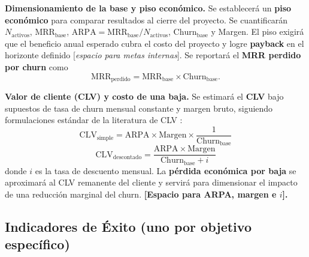 \textbf{Dimensionamiento de la base y piso económico.} Se establecerá un \textbf{piso económico} para comparar resultados al cierre del proyecto. Se cuantificarán \(N_{\mathrm{activos}}\), \(\mathrm{MRR}_{\mathrm{base}}\), \(\mathrm{ARPA} = \mathrm{MRR}_{\mathrm{base}}/N_{\mathrm{activos}}\), \(\mathrm{Churn}_{\mathrm{base}}\) y Margen. El piso exigirá que el beneficio anual esperado cubra el costo del proyecto y logre \textbf{payback} en el horizonte definido [\textit{espacio para metas internas}]. Se reportará el \textbf{MRR perdido por churn} como
\[
\mathrm{MRR}_{\mathrm{perdido}} = \mathrm{MRR}_{\mathrm{base}} \times \mathrm{Churn}_{\mathrm{base}}.
\]

\textbf{Valor de cliente (CLV) y costo de una baja.} Se estimará el \textbf{CLV} bajo supuestos de tasa de churn mensual constante y margen bruto, siguiendo formulaciones estándar de la literatura de CLV \citep{Gupta2006}:
\[
\mathrm{CLV}_{\mathrm{simple}} = \mathrm{ARPA} \times \mathrm{Margen} \times \frac{1}{\mathrm{Churn}_{\mathrm{base}}}
\]
\[
\mathrm{CLV}_{\mathrm{descontado}} = \frac{\mathrm{ARPA} \times \mathrm{Margen}}{\mathrm{Churn}_{\mathrm{base}} + i}
\]
donde \(i\) es la tasa de descuento mensual. La \textbf{pérdida económica por baja} se aproximará al CLV remanente del cliente y servirá para dimensionar el impacto de una reducción marginal del churn. \textbf{[Espacio para ARPA, margen e \(i\)].}

\subsection{Indicadores de Éxito (uno por objetivo específico)}

